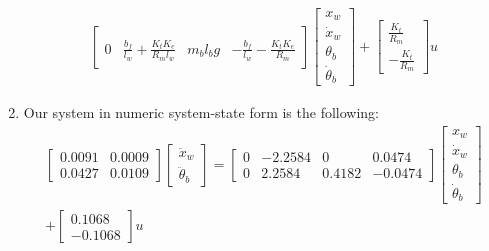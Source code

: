 \documentclass[11pt]{article} %
\begin{document}
\begin{enumerate}
\begin{equation*}
\begin{aligned}
\begin{bmatrix}
        \\[1.2em]
        0 &
        \frac{b_f}{l_w} + \frac{K_t K_e}{R_m l_w} &
        m_b l_b g &
        - \frac{b_f}{l_w} - \frac{K_t K_e}{R_m}
      \end{bmatrix}
      \begin{bmatrix}
        x_w\\
        \dot{x}_w\\
        \theta_b\\
        \dot{\theta}_b
      \end{bmatrix}
      +
      \begin{bmatrix}
        \frac{K_t}{R_m} \\[1.2em]
        -\frac{K_t}{R_m}
      \end{bmatrix}
      u
    \end{aligned}
  \end{equation*}
\item %
  Our system in numeric system-state form is the following:
  \begin{equation}\label{eq:numeric-ss}
    \begin{aligned}
      \begin{bmatrix}
        0.0091 & 0.0009 \\
        0.0427 & 0.0109
      \end{bmatrix}
      \begin{bmatrix}
        \ddot{x}_w \\
        \ddot{\theta}_b
      \end{bmatrix}
      =
      \begin{bmatrix}
        0 & -2.2584 & 0 & 0.0474 \\
        0 & 2.2584 & 0.4182 & -0.0474
      \end{bmatrix}
      \begin{bmatrix}
        x_w\\
        \dot{x}_w\\
        \theta_b\\
        \dot{\theta}_b
      \end{bmatrix}\\
      +
      \begin{bmatrix}
        0.1068 \\
        -0.1068
      \end{bmatrix}
      u
    \end{aligned}
  \end{equation}
\end{enumerate}
\end{document}
